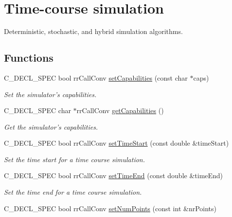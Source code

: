 \hypertarget{group__simulation}{
\section{\-Time-\/course simulation}
\label{group__simulation}
}


\-Deterministic, stochastic, and hybrid simulation algorithms.  


\subsection*{\-Functions}
\begin{DoxyCompactItemize}
\item 
\-C\-\_\-\-D\-E\-C\-L\-\_\-\-S\-P\-E\-C bool rr\-Call\-Conv \hyperlink{group__simulation_ga320ffeeba3e5505371b52ce61715bf82}{set\-Capabilities} (const char $\ast$caps)
\begin{DoxyCompactList}\small\item\em \-Set the simulator's capabilities. \end{DoxyCompactList}\item 
\-C\-\_\-\-D\-E\-C\-L\-\_\-\-S\-P\-E\-C char $\ast$rr\-Call\-Conv \hyperlink{group__simulation_gaecce7b3dda3548fbe579922aadf25610}{get\-Capabilities} ()
\begin{DoxyCompactList}\small\item\em \-Get the simulator's capabilities. \end{DoxyCompactList}\item 
\-C\-\_\-\-D\-E\-C\-L\-\_\-\-S\-P\-E\-C bool rr\-Call\-Conv \hyperlink{group__simulation_ga1a636a76ad610d99fe1c780bb3d9296d}{set\-Time\-Start} (const double \&time\-Start)
\begin{DoxyCompactList}\small\item\em \-Set the time start for a time course simulation. \end{DoxyCompactList}\item 
\-C\-\_\-\-D\-E\-C\-L\-\_\-\-S\-P\-E\-C bool rr\-Call\-Conv \hyperlink{group__simulation_ga1313e21d622cd846bdd75071e965eb6c}{set\-Time\-End} (const double \&time\-End)
\begin{DoxyCompactList}\small\item\em \-Set the time end for a time course simulation. \end{DoxyCompactList}\item 
\-C\-\_\-\-D\-E\-C\-L\-\_\-\-S\-P\-E\-C bool rr\-Call\-Conv \hyperlink{group__simulation_ga448ead53bb8913de664cc8ad675b4197}{set\-Num\-Points} (const int \&nr\-Points)

\end{DoxyCompactItemize}
